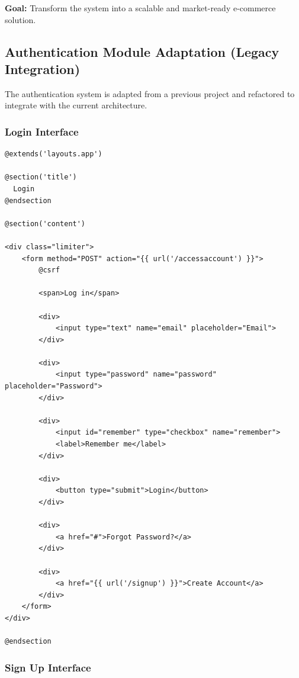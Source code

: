 \documentclass[12pt,a4paper]{article}
\begin{document}
\textbf{Goal:} Transform the system into a scalable and market-ready e-commerce solution.

\subsection{Authentication Module Adaptation (Legacy Integration)}

The authentication system is adapted from a previous project and refactored to integrate with the current architecture.

\subsubsection{Login Interface}

\begin{verbatim}
@extends('layouts.app')

@section('title')
  Login
@endsection

@section('content')

<div class="limiter">
    <form method="POST" action="{{ url('/accessaccount') }}">
        @csrf

        <span>Log in</span>

        <div>
            <input type="text" name="email" placeholder="Email">
        </div>

        <div>
            <input type="password" name="password" placeholder="Password">
        </div>

        <div>
            <input id="remember" type="checkbox" name="remember">
            <label>Remember me</label>
        </div>

        <div>
            <button type="submit">Login</button>
        </div>

        <div>
            <a href="#">Forgot Password?</a>
        </div>

        <div>
            <a href="{{ url('/signup') }}">Create Account</a>
        </div>
    </form>
</div>

@endsection
\end{verbatim}

\subsubsection{Sign Up Interface}
\end{document}
